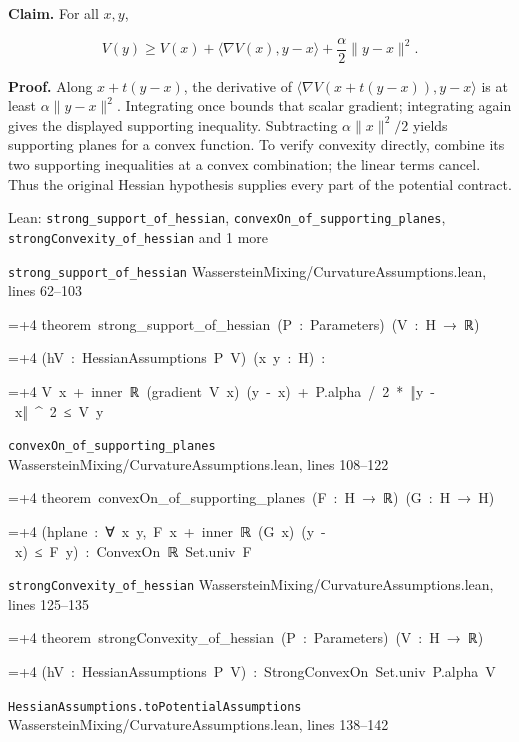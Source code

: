 \documentclass[11pt,a4paper]{report}
\newlength{\leancharwidth}
\newenvironment{leancode}{\par\smallskip\begingroup\ttfamily\footnotesize\raggedright
  \settowidth{\leancharwidth}{M}\setlength{\parskip}{0pt}\setlength{\parindent}{0pt}
  \frenchspacing}{\par\endgroup\smallskip}
\newcommand{\leanline}[2]{\hangindent=\dimexpr#1\leancharwidth+4\leancharwidth\relax
  \hangafter=1\noindent\hspace*{#1\leancharwidth}#2\par}
\newcommand{\leansource}[1]{\par{\footnotesize\color{leanmuted}#1}\par}
\begin{document}
\textbf{Claim.} For all \(x,y\),

\[V(y)\ge V(x)+\langle\nabla V(x),y-x\rangle+\frac\alpha2\|y-x\|^2.\]

\textbf{Proof.} Along \(x+t(y-x)\), the derivative of \(\langle\nabla V(x+t(y-x)),y-x\rangle\) is at least \(\alpha\|y-x\|^2\). Integrating once bounds that scalar gradient; integrating again gives the displayed supporting inequality. Subtracting \(\alpha\|x\|^2/2\) yields supporting planes for a convex function. To verify convexity directly, combine its two supporting inequalities at a convex combination; the linear terms cancel. Thus the original Hessian hypothesis supplies every part of the potential contract.

\begin{leanbox}{Lean: \texttt{strong\_\allowbreak{}support\_\allowbreak{}of\_\allowbreak{}hessian}, \texttt{convexOn\_\allowbreak{}of\_\allowbreak{}supporting\_\allowbreak{}planes}, \texttt{strongConvexity\_\allowbreak{}of\_\allowbreak{}hessian} and 1 more}
\leansource{\texttt{strong\_\allowbreak{}support\_\allowbreak{}of\_\allowbreak{}hessian} \quad WassersteinMixing/\allowbreak{}CurvatureAssumptions.lean, lines 62–103}
\begin{leancode}
\leanline{0}{theorem\ strong\_support\_of\_hessian\ (P\ :\ Parameters)\ (V\ :\ H\ →\ ℝ)}
\leanline{4}{(hV\ :\ HessianAssumptions\ P\ V)\ (x\ y\ :\ H)\ :}
\leanline{4}{V\ x\ +\ inner\ ℝ\ (gradient\ V\ x)\ (y\ -\ x)\ +\ P.alpha\ /\ 2\ *\ ‖y\ -\ x‖\ \textasciicircum{}\ 2\ ≤\ V\ y}
\end{leancode}
\leansource{\texttt{convexOn\_\allowbreak{}of\_\allowbreak{}supporting\_\allowbreak{}planes} \quad WassersteinMixing/\allowbreak{}CurvatureAssumptions.lean, lines 108–122}
\begin{leancode}
\leanline{0}{theorem\ convexOn\_of\_supporting\_planes\ (F\ :\ H\ →\ ℝ)\ (G\ :\ H\ →\ H)}
\leanline{4}{(hplane\ :\ ∀\ x\ y,\ F\ x\ +\ inner\ ℝ\ (G\ x)\ (y\ -\ x)\ ≤\ F\ y)\ :\ ConvexOn\ ℝ\ Set.univ\ F}
\end{leancode}
\leansource{\texttt{strongConvexity\_\allowbreak{}of\_\allowbreak{}hessian} \quad WassersteinMixing/\allowbreak{}CurvatureAssumptions.lean, lines 125–135}
\begin{leancode}
\leanline{0}{theorem\ strongConvexity\_of\_hessian\ (P\ :\ Parameters)\ (V\ :\ H\ →\ ℝ)}
\leanline{4}{(hV\ :\ HessianAssumptions\ P\ V)\ :\ StrongConvexOn\ Set.univ\ P.alpha\ V}
\end{leancode}
\leansource{\texttt{HessianAssumptions.\allowbreak{}toPotentialAssumptions} \quad WassersteinMixing/\allowbreak{}CurvatureAssumptions.lean, lines 138–142}

\end{leanbox}
\end{document}

